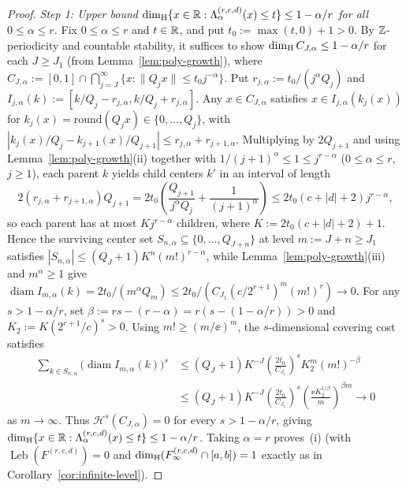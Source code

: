 \begin{proof}
\emph{Step 1: Upper bound $\dim_{\mathrm{H}}\{x\in\mathbb{R}:\Lambda_\alpha^{(r,c,d)}(x)\le t\}\le1-\alpha/r$
for all $0\le\alpha\le r$.} Fix $0\le\alpha\le r$ and $t\in\mathbb{R}$, and put
$t_0:=\max(t,0)+1>0$. By $\mathbb{Z}$-periodicity and countable stability, it suffices to
show $\dim_{\mathrm{H}} C_{J,\alpha}\le1-\alpha/r$ for each $J\ge J_1$ (from
Lemma~\ref{lem:poly-growth}), where
$C_{J,\alpha}:=[0,1]\cap\bigcap_{j=J}^\infty\{x:\|Q_jx\|\le t_0j^{-\alpha}\}$.
Put $r_{j,\alpha}:=t_0/(j^\alpha Q_j)$ and
$I_{j,\alpha}(k):=[k/Q_j-r_{j,\alpha},k/Q_j+r_{j,\alpha}]$. Any $x\in C_{J,\alpha}$
satisfies $x\in I_{j,\alpha}(k_j(x))$ for $k_j(x)=\mathrm{round}(Q_jx)\in\{0,\dots,Q_j\}$,
with $|k_j(x)/Q_j-k_{j+1}(x)/Q_{j+1}|\le r_{j,\alpha}+r_{j+1,\alpha}$. Multiplying
by $2Q_{j+1}$ and using Lemma~\ref{lem:poly-growth}(ii) together with
$1/(j+1)^\alpha\le1\le j^{r-\alpha}$ ($0\le\alpha\le r$, $j\ge1$), each parent
$k$ yields child centers $k'$ in an interval of length
\[
2(r_{j,\alpha}+r_{j+1,\alpha})Q_{j+1}
=2t_0\left(\frac{Q_{j+1}}{j^\alpha Q_j}+\frac{1}{(j+1)^\alpha}\right)
\le 2t_0(c+|d|+2)j^{r-\alpha},
\]
so each parent has at most $Kj^{r-\alpha}$ children, where $K:=2t_0(c+|d|+2)+1$.
Hence the surviving center set $S_{n,\alpha}\subseteq\{0,\dots,Q_{J+n}\}$ at
level $m:=J+n\ge J_1$ satisfies
$|S_{n,\alpha}|\le(Q_J+1)K^n(m!)^{r-\alpha}$, while
Lemma~\ref{lem:poly-growth}(iii) and $m^\alpha\ge1$ give
$\operatorname{diam}I_{m,\alpha}(k)=2t_0/(m^\alpha Q_m)\le2t_0/(C_{J_1}(c/2^{r+1})^m(m!)^r)\to0$.
For any $s>1-\alpha/r$, set $\beta:=rs-(r-\alpha)=r(s-(1-\alpha/r))>0$ and
$K_2:=K(2^{r+1}/c)^s>0$. Using $m!\ge(m/\ee)^m$, the $s$-dimensional covering
cost satisfies
\begin{align*}
\sum_{k\in S_{n,\alpha}}\bigl(\operatorname{diam}I_{m,\alpha}(k)\bigr)^s
&\le(Q_J+1)K^{-J}\left(\frac{2t_0}{C_{J_1}}\right)^s K_2^m(m!)^{-\beta}\\
&\le(Q_J+1)K^{-J}\left(\frac{2t_0}{C_{J_1}}\right)^s
\left(\frac{\ee K_2^{1/\beta}}{m}\right)^{\beta m}\longrightarrow0
\end{align*}
as $m\to\infty$. Thus $\mathcal H^s(C_{J,\alpha})=0$ for every $s>1-\alpha/r$,
giving $\dim_{\mathrm{H}}\{x\in\mathbb{R}:\Lambda_\alpha^{(r,c,d)}(x)\le t\}\le1-\alpha/r$. Taking
$\alpha=r$ proves~(i) (with $\operatorname{Leb}(F^{(r,c,d)})=0$ and
$\dim_{\mathrm{H}}(F_\infty^{(r,c,d)}\cap[a,b])=1$ exactly as in Corollary~\ref{cor:infinite-level}).


\end{proof}
